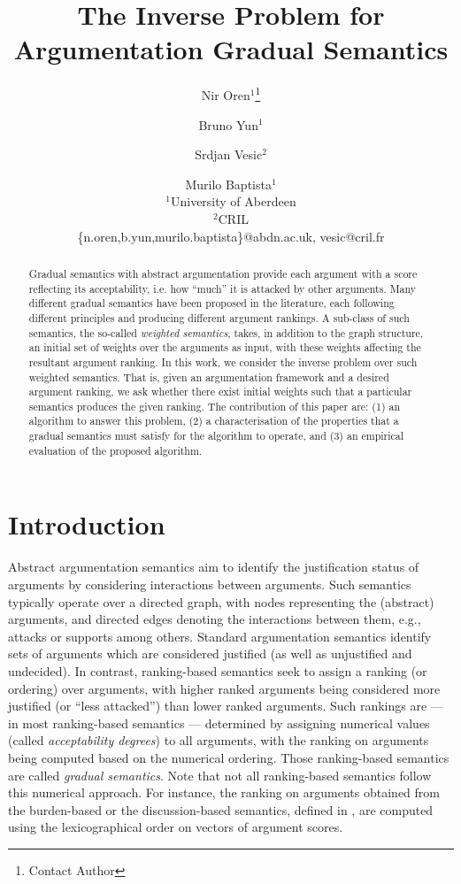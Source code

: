 \documentclass{article}
\title{The Inverse Problem for Argumentation Gradual Semantics}
\author{Nir Oren$^1$\footnote{Contact Author} \and Bruno Yun$^1$\and Srdjan Vesic$^2$ \and Murilo Baptista$^1$\\
$^1$University of Aberdeen\\
$^2$CRIL\\
\{n.oren,b.yun,murilo.baptista\}@abdn.ac.uk, vesic@cril.fr}
\date{}
\begin{document}
\maketitle

\begin{abstract}
Gradual semantics with abstract argumentation provide each argument with a score reflecting its acceptability, i.e. how ``much'' it is attacked by other arguments.
%
Many different gradual semantics have been proposed in the literature, each following different principles and producing different argument rankings. 
%
A sub-class of such semantics, the so-called \emph{weighted semantics}, takes, in addition to the graph structure, an initial set of weights over the arguments as input, with these weights affecting the resultant argument ranking.
%
In this work, we consider the inverse problem over such weighted semantics. That is, given an argumentation framework and a desired argument ranking, we ask whether there exist initial weights such that a particular semantics produces the given ranking. 
%
The contribution of this paper are: (1) an algorithm to answer this problem, (2) a characterisation of the properties that a gradual semantics must satisfy for the algorithm to operate, and (3) an empirical evaluation of the proposed algorithm.
\end{abstract}

\section{Introduction}

Abstract argumentation semantics aim to identify the justification status of arguments by considering interactions between arguments. Such semantics typically operate over a directed graph, with nodes representing the (abstract) arguments, and directed edges denoting the interactions between them, e.g., attacks or supports among others. 
%
Standard argumentation semantics \cite{baroni_introduction_2011,dung_acceptability_1995,caminada_semi-stable_2012}  identify sets of arguments which are considered justified (as well as unjustified and undecided).
%
In contrast, ranking-based semantics seek to assign a ranking (or ordering) over arguments, with higher ranked arguments being considered more justified (or ``less attacked'') than lower ranked arguments.
%
Such rankings are --- in most ranking-based semantics --- determined by assigning numerical values (called \emph{acceptability degrees}) to all arguments, with the ranking on arguments being computed based on the numerical ordering.
%
Those ranking-based semantics are called \textit{gradual semantics}. 
%
Note that not all ranking-based semantics follow this numerical approach. For instance, the ranking on arguments obtained from the burden-based or the discussion-based semantics, defined in \cite{amgoud_ranking-based_2013}, are computed using the lexicographical order on vectors of argument scores.
\end{document}
